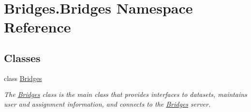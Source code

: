\hypertarget{namespace_bridges_1_1_bridges}{}\section{Bridges.\+Bridges Namespace Reference}
\label{namespace_bridges_1_1_bridges}
\subsection*{Classes}
\begin{DoxyCompactItemize}
\item 
class \hyperlink{class_bridges_1_1_bridges_1_1_bridges}{Bridges}
\begin{DoxyCompactList}\small\item\em The \hyperlink{class_bridges_1_1_bridges_1_1_bridges}{Bridges} class is the main class that provides interfaces to datasets, maintains user and assignment information, and connects to the \hyperlink{class_bridges_1_1_bridges_1_1_bridges}{Bridges} server. \end{DoxyCompactList}\end{DoxyCompactItemize}
